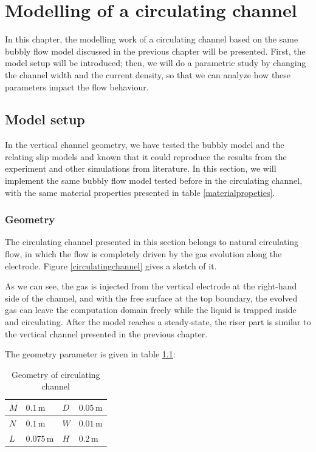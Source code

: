 \chapter{Modelling of a circulating channel}


 In this chapter, the modelling work of a circulating channel based on the same bubbly flow model discussed in the previous chapter will be presented. First, the model setup will be introduced; then, we will do a parametric study by changing the channel width and the current density, so that we can analyze how these parameters impact the flow behaviour. 
 
 
\section{Model setup}

In the vertical channel geometry, we have tested the bubbly model and the relating slip models and known that it could reproduce the results from the experiment and other simulations from literature. In this section, we will implement the same bubbly flow model tested before in the circulating channel, with the same material properties presented in table \ref{materialpropeties}. 


\subsection{Geometry}
The circulating channel presented in this section belongs to natural circulating flow, in which the flow is completely driven by the gas evolution along the electrode. Figure \ref{circulatingchannel} gives a sketch of it.


As we can see, the gas is injected from the vertical electrode at the right-hand side of the channel, and with the free surface at the top boundary, the evolved gas can leave the computation domain freely while the liquid is trapped inside and circulating. After the model reaches a steady-state, the riser part is similar to the vertical channel presented in the previous chapter.

The geometry parameter is given in table \ref{geometrypropeties}:

\begin{table}[h!]
\centering
\caption{Geometry of circulating channel}
\label{geometrypropeties}
\begin{tabular}{l  l| l  l}
\hline
    $M$  & $0.1 \, \mathrm{m}$ & $D$ & $0.05\, \mathrm{m}$ \\
\hline
    $N$  & $0.1\, \mathrm{m}$  & $W$ & $0.01\, \mathrm{m}$ \\
\hline
    $L$ & $0.075\, \mathrm{m}$ & $H$ & $0.2\, \mathrm{m}$ \\
\hline
\end{tabular}
\end{table}

